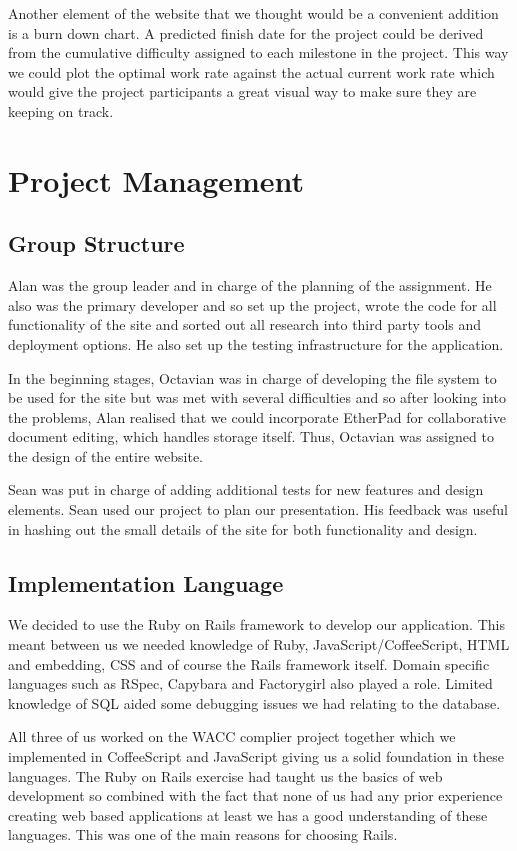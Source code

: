 \documentclass[a4wide, 11pt]{article}
\begin{document}
Another element of the website that we thought would be a convenient addition is a burn down chart. A predicted finish date for the project could be derived from the cumulative difficulty assigned to each milestone in the project. This way we could plot the optimal work rate against the actual current work rate which would give the project participants a great visual way to make sure they are keeping on track.
\clearpage

\section{Project Management}
\subsection{Group Structure}
Alan was the group leader and in charge of the planning of the assignment. He also was the primary developer and so set up the project, wrote the code for all functionality of the site and sorted out all research into third party tools and deployment options. He also set up the testing infrastructure for the application.

In the beginning stages, Octavian was in charge of developing the file system to be used for the site but was met with several difficulties and so after looking into the problems, Alan realised that we could incorporate EtherPad for collaborative document editing, which handles storage itself. Thus, Octavian was assigned to the design of the entire website. 

Sean was put in charge of adding additional tests for new features and design elements. Sean used our project to plan our presentation. His feedback was useful in hashing out the small details of the site for both functionality and design.

\subsection{Implementation Language}
We decided to use the Ruby on Rails framework to develop our application. This meant between us we needed knowledge of Ruby, JavaScript/CoffeeScript, HTML and embedding, CSS and of course the Rails framework itself. Domain specific languages such as RSpec, Capybara and Factorygirl also played a role. Limited knowledge of SQL aided some debugging issues we had relating to the database.

All three of us worked on the WACC complier project together which we implemented in CoffeeScript and JavaScript giving us a solid foundation in these languages. The Ruby on Rails exercise had taught us the basics of web development so combined with the fact that none of us had any prior experience creating web based applications at least we has a good understanding of these languages. This was one of the main reasons for choosing Rails. 
\end{document}
